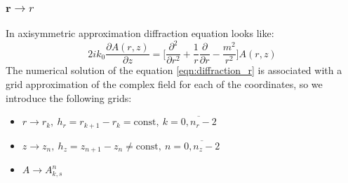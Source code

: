 \documentclass[a4paper, 12pt]{article}
\begin{document}
\subsubsection{$\mathbf{r}\longrightarrow r$}
In axisymmetric approximation diffraction equation looks like:
\begin{equation}
\label{eqn:diffraction_r}
2 i k_0 \frac{\partial A (r, z)}{\partial z} = \biggl[ \frac{\partial^2}{\partial r^2} + \frac1{r}\frac{\partial}{\partial r} - \frac{m^2}{r^2} \biggr] A(r,z)
\end{equation}
The numerical solution of the equation \eqref{eqn:diffraction_r} is associated with a grid approximation of the complex field for each of the coordinates, so we introduce the following grids:
\begin{itemize}
\item $r\longrightarrow r_k, \ h_r = r_{k+1} - r_{k} = \text{const}, \ k = \overline{0, n_r-2}$
\item $z\longrightarrow z_n, \ h_z = z_{n+1} - z_{n} \ne \text{const}, \ n = \overline{0, n_z-2}$
\item $A \longrightarrow A^n_{k, s}$
\end{itemize}
\end{document}
